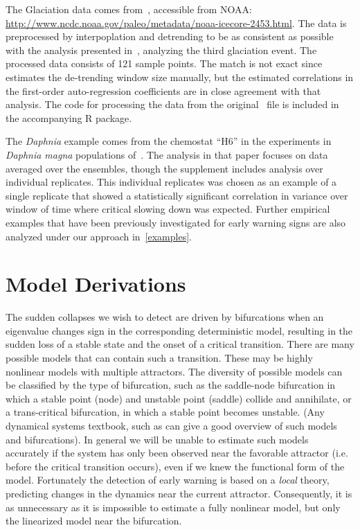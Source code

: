 \documentclass[authoryear, preprint,review,12pt]{elsarticle}
\begin{document}
The Glaciation data comes from~\citet{Petit1999}, accessible from NOAA:\\
\href{http://www.ncdc.noaa.gov/paleo/metadata/noaa-icecore-2453.html}{http://www.ncdc.noaa.gov/paleo/metadata/noaa-icecore-2453.html}.
The data is preprocessed by interpoplation and detrending to be as consistent as possible with the analysis presented in~\citet{Dakos2008},
analyzing the third glaciation event. 
The processed data consists of 121 sample points. 
The match is not exact since~\citet{Dakos2008} estimates the de-trending window size manually,
but the estimated correlations in the first-order auto-regression coefficients are in close agreement with that analysis. 
The code for processing the data from the original~\citet{Petit1999} file is included in the accompanying R package.  


The \emph{Daphnia} example comes from the chemostat ``H6'' in the experiments in \emph{Daphnia magna} populations of~\citet{Drake2010}. 
The analysis in that paper focuses on data averaged over the ensembles, though the supplement includes analysis over individual replicates. 
This individual replicates was chosen as an example of a single replicate 
that showed a statistically significant correlation in variance over window of time where critical slowing down was expected. 
Further empirical examples that have been previously investigated for early warning signs are also analyzed under our approach in~\ref{examples}.   



\section{Model Derivations}\label{modelderivations}
The sudden collapses we wish to detect are driven by bifurcations when an eigenvalue changes sign in the corresponding deterministic model,
resulting in the sudden loss of a stable state and the onset of a critical transition.
There are many possible models that can contain such a transition.
These may be highly nonlinear models with multiple attractors.
The diversity of possible models can be classified by the type of bifurcation,
such as the saddle-node bifurcation in which a stable point (node) and unstable point (saddle) collide and annihilate,
or a trans-critical bifurcation, in which a stable point becomes unstable.  
(Any dynamical systems textbook, such as \citet{Guckenheimer1983} can give a good overview of such models and bifurcations). 
In general we will be unable to estimate such models accurately if the system has only been observed near the favorable attractor
(i.e. before the critical transition occurs),
even if we knew the functional form of the model.
Fortunately the detection of early warning is based on a \emph{local} theory,
predicting changes in the dynamics near the current attractor.
Consequently, it is as unnecessary as it is impossible to estimate a fully nonlinear model,
but only the linearized model near the bifurcation.
\end{document}
